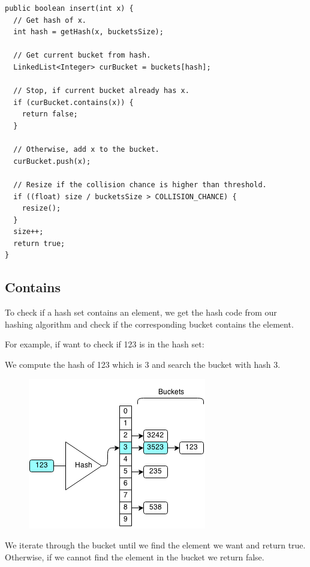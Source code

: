 \documentclass[11pt,oneside]{book}
\makeatletter
\def\maxwidth#1{\ifdim\Gin@nat@width>#1 #1\else\Gin@nat@width\fi}
\makeatother
\begin{document}
\begin{lstlisting}
public boolean insert(int x) {
  // Get hash of x.
  int hash = getHash(x, bucketsSize);

  // Get current bucket from hash.
  LinkedList<Integer> curBucket = buckets[hash];
  
  // Stop, if current bucket already has x.
  if (curBucket.contains(x)) {
    return false;
  }
  
  // Otherwise, add x to the bucket.
  curBucket.push(x);
  
  // Resize if the collision chance is higher than threshold.
  if ((float) size / bucketsSize > COLLISION_CHANCE) {
    resize();
  }
  size++;
  return true;
}
\end{lstlisting}

\subsection{Contains}

To check if a hash set contains an element, we get the hash code from our hashing algorithm and check if the corresponding bucket contains the element.

For example, if want to check if 123 is in the hash set:

We compute the hash of 123 which is 3 and search the bucket with hash 3.

\vspace{5px}\begin{figure}[H]\centering
        \includegraphics[width=0.66\maxwidth{\textwidth}]{hashsetcontains.png}
        \end{figure}

We iterate through the bucket until we find the element we want and return true. Otherwise, if we cannot find the element in the bucket we return false.
\end{document}
